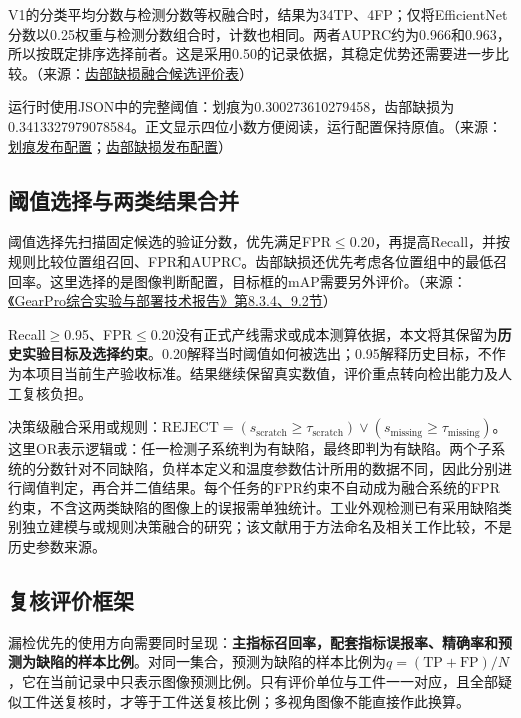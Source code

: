 V1的分类平均分数与检测分数等权融合时，结果为34TP、4FP；仅将EfficientNet分数以0.25权重与检测分数组合时，计数也相同。两者AUPRC约为0.966和0.963，所以按既定排序选择前者。这是采用0.50的记录依据，其稳定优势还需要进一步比较。（来源：\protect\hyperlink{source-9}{齿部缺损融合候选评价表}）

运行时使用JSON中的完整阈值：划痕为0.300273610279458，齿部缺损为0.3413327979078584。正文显示四位小数方便阅读，运行配置保持原值。（来源：\protect\hyperlink{source-1}{划痕发布配置}；\protect\hyperlink{source-2}{齿部缺损发布配置}）

\FloatBarrier{}\subsection{阈值选择与两类结果合并}
阈值选择先扫描固定候选的验证分数，优先满足FPR\ensuremath{\leq}0.20，再提高Recall，并按规则比较位置组召回、FPR和AUPRC。齿部缺损还优先考虑各位置组中的最低召回率。这里选择的是图像判断配置，目标框的mAP需要另外评价。（来源：\protect\href{run:../GearPro_综合技术报告_Markdown含配图/GearPro_综合实验与部署技术报告.md}{《GearPro综合实验与部署技术报告》第8.3.4、9.2节}）

Recall\ensuremath{\geq}0.95、FPR\ensuremath{\leq}0.20没有正式产线需求或成本测算依据，本文将其保留为\textbf{历史实验目标及选择约束}。0.20解释当时阈值如何被选出；0.95解释历史目标，不作为本项目当前生产验收标准。结果继续保留真实数值，评价重点转向检出能力及人工复核负担。

决策级融合采用或规则：$\mathrm{REJECT}=(s_{\mathrm{scratch}}\geq\tau_{\mathrm{scratch}})\lor(s_{\mathrm{missing}}\geq\tau_{\mathrm{missing}})$。这里OR表示逻辑或：任一检测子系统判为有缺陷，最终即判为有缺陷。两个子系统的分数针对不同缺陷，负样本定义和温度参数估计所用的数据不同，因此分别进行阈值判定，再合并二值结果。每个任务的FPR约束不自动成为融合系统的FPR约束，不含这两类缺陷的图像上的误报需单独统计。工业外观检测已有采用缺陷类别独立建模与或规则决策融合的研究\cite{ref15}；该文献用于方法命名及相关工作比较，不是历史参数来源。

\FloatBarrier{}\subsection{复核评价框架}
漏检优先的使用方向需要同时呈现：\textbf{主指标召回率，配套指标误报率、精确率和预测为缺陷的样本比例}。对同一集合，预测为缺陷的样本比例为$q=(\mathrm{TP}+\mathrm{FP})/N$，它在当前记录中只表示图像预测比例。只有评价单位与工件一一对应，且全部疑似工件送复核时，才等于工件送复核比例；多视角图像不能直接作此换算。


